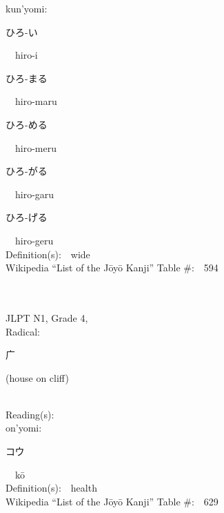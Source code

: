\begin{multicols}{2}
{\hspace*{1em}}kun'yomi:\ \ \\
{\hspace*{2em}}{\begin{CJK}{UTF8}{min} ひろ-い \end{CJK}}\ \ hiro-i\ \ \\
{\hspace*{2em}}{\begin{CJK}{UTF8}{min} ひろ-まる \end{CJK}}\ \ hiro-maru\ \ \\
{\hspace*{2em}}{\begin{CJK}{UTF8}{min} ひろ-める \end{CJK}}\ \ hiro-meru\ \ \\
{\hspace*{2em}}{\begin{CJK}{UTF8}{min} ひろ-がる \end{CJK}}\ \ hiro-garu\ \ \\
{\hspace*{2em}}{\begin{CJK}{UTF8}{min} ひろ-げる \end{CJK}}\ \ hiro-geru\ \ \\
Definition(s):\ \ wide \\
Wikipedia ``List of the J\=oy\=o Kanji'' Table \#:\ \ 594 \\
\ \ \\
{\fontsize{34pt}{40pt}  }\ \ \\  %
{JLPT N1, Grade 4, \\Radical:\ \ {\begin{CJK}{UTF8}{min} 广 \end{CJK}} (house on cliff) } \\
Reading(s):\ \ \\
{\hspace*{1em}}on'yomi:\ \ \\
{\hspace*{2em}}{\begin{CJK}{UTF8}{min} コウ \end{CJK}}\ \ k\=o\ \ \\
Definition(s):\ \ health \\
Wikipedia ``List of the J\=oy\=o Kanji'' Table \#:\ \ 629 \\

\end{multicols}
